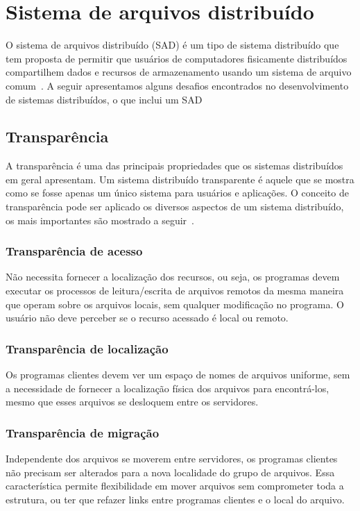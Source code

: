 	\section{Sistema de arquivos distribuído}
	
	O sistema de arquivos distribuído (SAD) é um tipo de sistema distribuído que tem proposta de permitir que usuários de computadores fisicamente distribuídos compartilhem dados e recursos de armazenamento usando um sistema de arquivo comum~\cite{levy90}. A seguir apresentamos alguns desafios encontrados no desenvolvimento de sistemas distribuídos, o que inclui um SAD
	
	\subsection{Transparência}
	A transparência é uma das principais propriedades que os sistemas distribuídos em geral apresentam. Um sistema distribuído transparente é aquele que se mostra como se fosse apenas um único sistema para usuários e aplicações. O conceito de transparência pode ser aplicado os diversos aspectos de um sistema distribuído, os mais importantes são mostrado a seguir~\cite{tanenbaum07}.	

	\subsubsection{Transparência de acesso} Não necessita fornecer a localização dos recursos, ou seja, os programas devem executar os processos de leitura/escrita de arquivos remotos da mesma maneira que operam sobre os arquivos locais, sem qualquer modificação no programa. O usuário não deve perceber se o recurso acessado é
	local ou remoto.
	
	\subsubsection{Transparência de localização} Os programas clientes devem ver um espaço de nomes de arquivos uniforme, sem a necessidade de fornecer a localização física dos arquivos para encontrá-los, mesmo que esses arquivos se desloquem entre os servidores.
	
	\subsubsection{Transparência de migração} Independente dos arquivos se moverem entre servidores, os programas clientes não precisam ser alterados para a nova localidade do grupo de arquivos. Essa característica permite flexibilidade em mover arquivos sem comprometer toda a estrutura, ou ter que refazer links entre programas clientes e o local do arquivo.
	
